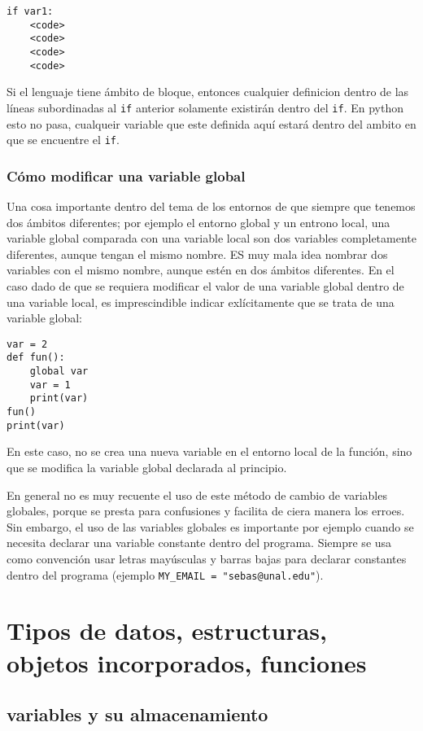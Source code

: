 \begin{verbatim}
if var1:
    <code>
    <code>
    <code>
    <code>
\end{verbatim}

Si el lenguaje tiene ámbito de bloque, entonces cualquier definicion dentro de
las líneas subordinadas al \texttt{if} anterior solamente existirán dentro del
\texttt{if}. En python esto no pasa, cualqueir variable que este definida aquí
estará dentro del ambito en que se encuentre el \texttt{if}.

\subsubsection{Cómo modificar una variable global}

Una cosa importante dentro del tema de los entornos de que siempre que tenemos
dos ámbitos diferentes; por ejemplo el entorno global y un entrono local, una
variable global comparada con una variable local son dos variables
completamente diferentes, aunque tengan el mismo nombre. ES muy mala idea
nombrar dos variables con el mismo nombre, aunque estén en dos ámbitos
diferentes. En el caso dado de que se requiera modificar el valor de una
variable global dentro de una variable local, es imprescindible indicar
exlícitamente que se trata de una variable global:

\begin{verbatim}
var = 2
def fun():
    global var
    var = 1
    print(var)
fun()
print(var)
\end{verbatim}

En este caso, no se crea una nueva variable en el entorno local de la función,
sino que se modifica la variable global declarada al principio.

En general no es muy recuente el uso de este método de cambio de variables
globales, porque se presta para confusiones y facilita de ciera manera los
erroes. Sin embargo, el uso de las variables globales es importante por ejemplo
cuando se necesita declarar una variable constante dentro del programa. Siempre
se usa como convención usar letras mayúsculas y barras bajas para declarar
constantes dentro del programa (ejemplo \texttt{MY\_EMAIL = "sebas@unal.edu"}).

\section{Tipos de datos, estructuras, objetos incorporados, funciones}

\subsection{variables y su almacenamiento}

